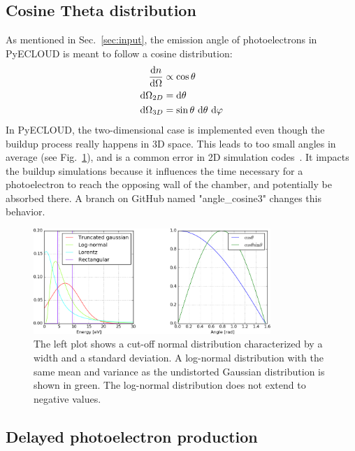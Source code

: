 
\subsection{Cosine Theta distribution}
As mentioned in Sec.~\ref{sec:input}, the emission angle of photoelectrons in PyECLOUD is meant to follow a cosine distribution:
\begin{align}
    \frac{\text{d}n}{\text{d}\Omega} &\propto \cos\theta
    \\
    \text{d}\Omega_{2D} &= \text{d}\theta
    \\
    \text{d}\Omega_{3D} &= \sin\theta~\text{d}\theta~\text{d}\varphi
    \label{eq:angles}
\end{align}
In PyECLOUD, the two-dimensional case is implemented even though the buildup process really happens in 3D space.
This leads to too small angles in average (see Fig.~\ref{fig:distribution}), and is a common error in 2D simulation codes~\cite{angle}.
It impacts the buildup simulations because it influences the time necessary for a photoelectron to reach the opposing wall of the chamber, and potentially be absorbed there.
A branch on GitHub named "angle\_cosine3" changes this behavior.

\begin{figure}[tbh]
    \centering
    \includegraphics[width=0.8\textwidth]{../plots/distributions.png}
    \caption{
        The left plot shows a cut-off normal distribution characterized by a width and a standard deviation.
        A log-normal distribution with the same mean and variance as the undistorted Gaussian distribution is shown in green.
    The log-normal distribution does not extend to negative values.
    }
    \label{fig:distribution}
\end{figure}


\subsection{Delayed photoelectron production}

